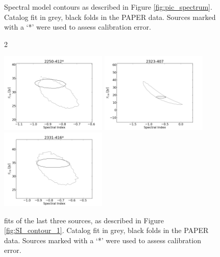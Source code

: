\documentclass[preprint]{aastex}
\begin{document}
\begin{figure}[htbp]
\begin{center}
\end{center}
\caption{Spectral model contours as described in Figure \ref{fig:pic_spectrum}. 
Catalog fit in grey, black folds in the PAPER 
data. 
Sources marked with a
`*' were used to assess calibration error.
}\label{fig:SI_contour_2}
\end{figure}
\clearpage
\begin{figure}[htbp]2\begin{center}
\includegraphics[width=2in]{plots/2250-412_SI_MCMC.png} %
\includegraphics[width=2in]{plots/2323-407_SI_MCMC.png} %
\includegraphics[width=2in]{plots/2331-416_SI_MCMC.png} %
\end{center}
\caption{fits of the last three sources, as described in Figure \ref{fig:SI_contour_1}. 
Catalog fit in grey, black folds in the PAPER 
data. 
Sources marked with a
`*' were used to assess calibration error.
}\label{fig:SI_contour_3}
\end{figure}


\end{document}
